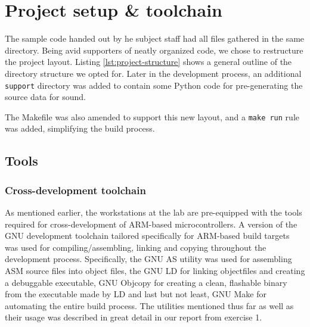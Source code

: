 \section{Project setup \& toolchain}

The sample code handed out by he subject staff had all files gathered in the same directory. Being avid supporters of neatly organized code, we chose to restructure the project layout. Listing \ref{lst:project-structure} shows a general outline of the directory structure we opted for. Later in the development process, an additional \texttt{support} directory was added to contain some Python code for pre-generating the source data for sound.


The Makefile was also amended to support this new layout, and a \texttt{make run} rule was added, simplifying the build process.

\subsection{Tools}

\subsubsection{Cross-development toolchain}

As mentioned earlier, the workstations at the lab are pre-equipped with the tools required for cross-development of ARM-based microcontrollers. A version of the GNU development toolchain tailored specifically for ARM-based build targets was used for compiling/assembling, linking and copying throughout the development process. Specifically, the GNU AS \cite[p.~4]{exercise1report} utility was used for assembling ASM source files into object files, the GNU LD \cite[p.~4]{exercise1report} for linking objectfiles and creating a debuggable executable, GNU Objcopy \cite[p.~5]{exercise1report} for creating a clean, flashable binary from the executable made by LD and last but not least, GNU Make \cite[p.~5]{exercise1report} for automating the entire build process. The utilities mentioned thus far as well as their usage was described in great detail in our report from exercise 1.

